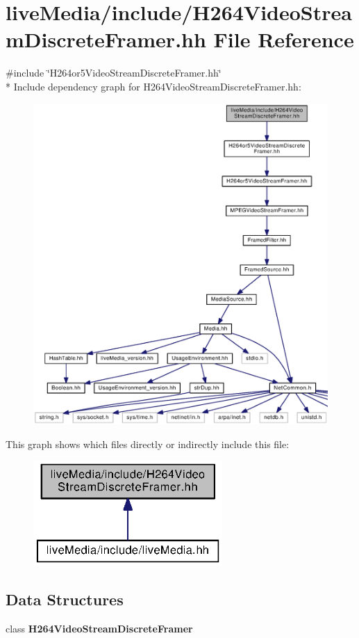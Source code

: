 \section{live\+Media/include/\+H264\+Video\+Stream\+Discrete\+Framer.hh File Reference}
\label{H264VideoStreamDiscreteFramer_8hh}
{\ttfamily \#include \char`\"{}H264or5\+Video\+Stream\+Discrete\+Framer.\+hh\char`\"{}}\\*
Include dependency graph for H264\+Video\+Stream\+Discrete\+Framer.\+hh\+:
\nopagebreak
\begin{figure}[H]
\begin{center}
\leavevmode
\includegraphics[width=350pt]{H264VideoStreamDiscreteFramer_8hh__incl}
\end{center}
\end{figure}
This graph shows which files directly or indirectly include this file\+:
\nopagebreak
\begin{figure}[H]
\begin{center}
\leavevmode
\includegraphics[width=204pt]{H264VideoStreamDiscreteFramer_8hh__dep__incl}
\end{center}
\end{figure}
\subsection*{Data Structures}
\begin{DoxyCompactItemize}
\item 
class {\bf H264\+Video\+Stream\+Discrete\+Framer}
\end{DoxyCompactItemize}
